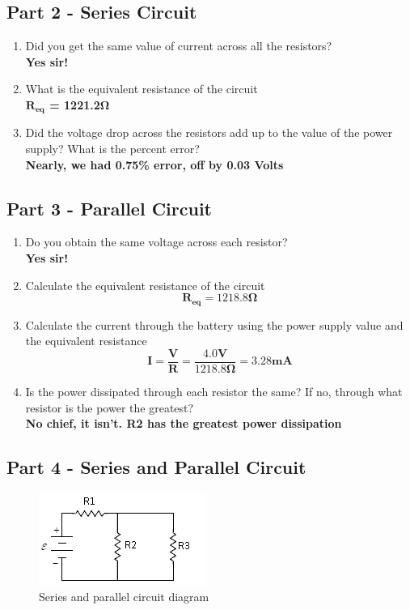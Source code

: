 \documentclass[titlepage]{article}
\begin{document}
\subsection*{Part 2 - Series Circuit} 
    \begin{enumerate} 
        \item Did you get the same value of current across all the resistors? \\ 
            \textbf{Yes sir!}
        \item What is the equivalent resistance of the circuit\\ 
            \textbf{$\mathbf{R_{eq}}$ = 1221.2$\mathbf{\Omega}$ }

        \item Did the voltage drop across the resistors add up to the value of the power supply? What is the percent error?\\ 
            \textbf{Nearly, we had 0.75\% error, off by 0.03 Volts}


    \end{enumerate}

\subsection*{Part 3 - Parallel Circuit} 
    \begin{enumerate} 
        \item Do you obtain the same voltage across each resistor? \\
            \textbf{Yes sir!} 

        \item Calculate the equivalent resistance of the circuit \\
            $$\mathbf{R_{eq} = 1218.8 \Omega}$$
        \item Calculate the current through the battery using the power supply value and the equivalent resistance \\ 
            $$ \mathbf{I=\frac{V}{R} = \frac{4.0V}{1218.8\Omega} =3.28 mA }$$ 
        \item Is the power dissipated through each resistor the same? If no, through what resistor is the power the greatest?\\
            \textbf{No chief, it isn't. R2 has the greatest power dissipation} 
    \end{enumerate}

\subsection*{Part 4 - Series and Parallel Circuit} 
    \FloatBarrier
    \begin{figure}[hbt!]
        \centering
        \caption{Series and parallel circuit diagram}
        \includegraphics[scale = 1.2]{images/questions/circuit.png}
    \end{figure}
    \FloatBarrier
\end{document}
